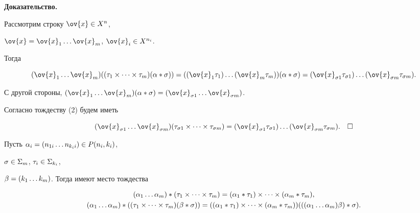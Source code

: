 {\bf Доказательство.}


Рассмотрим строку $\ov{x}\in X^n$,


$\ov{x}= \ov{x}_1\dotsc \ov{x}_m$, $\ov{x}_i\in X^{n_i}$.


Тогда


$$


(\ov{x}_1\dotsc \ov{x}_m)((\t_1\times\dotsb\times\t_m)(\al*\s))=


((\ov{x}_1\t_1)\dotsc (\ov{x}_m\t_m))(\al*\s)=


(\ov{x}_{\s 1}\t_{\s 1})\dotsc (\ov{x}_{\s m}\t_{\s m}).


$$


С другой стороны, $(\ov{x}_1\dotsc \ov{x}_m)(\al*\s)=


(\ov{x}_{\s 1}\dotsc \ov{x}_{\s m})$.


Согласно тождеству (2) будем иметь


$$


(\ov{x}_{\s 1}\dotsc \ov{x}_{\s m})(\t_{\s 1}\times\dotsb \times\t_{\s m})=


(\ov{x}_{\s 1}\t_{\s 1})\dotsc (\ov{x}_{\s m}\t_{\s m}).\quad\square


$$








\begin{lem}


Пусть $\alpha_i=(n_{1 i} \dotsc n_{k_i i})\in P(n_i,k_i)$,


$\sigma\in \Sigma_m$, $\tau_i\in \Sigma_{k_i}$,


$\beta=(k_1\dotsc k_m)$. Тогда имеют место тождества


\begin{gather}


(\al_1\dotsc \al_m)*(\t_1\times\dotsb\times\t_m)=


(\al_1*\t_1)\times\dotsb\times (\al_m*\t_m), \\


%


(\al_1\dotsc \al_m)*((\t_1\times\dotsb\times\t_m)(\be*\s))=


((\al_1*\t_1)\times\dotsb\times (\al_m*\t_m))(((\al_1\dotsc \al_m)\be)*\s).


\end{gather}


\end{lem}





